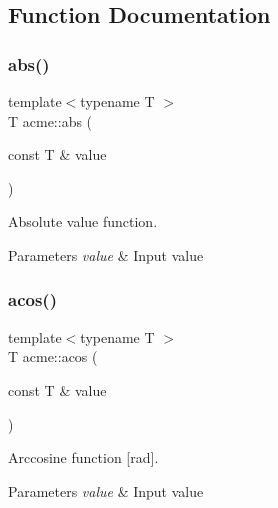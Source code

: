 \subsection{Function Documentation}
\mbox{\label{namespaceacme_add7b88267b101300f6818a0ed6dacf2a}} 
\subsubsection{\texorpdfstring{abs()}{abs()}}
{\footnotesize\ttfamily template$<$typename T $>$ \\
T acme\+::abs (\begin{DoxyParamCaption}\item[{const T \&}]{value }\end{DoxyParamCaption})\hspace{0.3cm}{\ttfamily [inline]}}



Absolute value function. 


\begin{DoxyParams}{Parameters}
{\em value} & Input value \\
\hline
\end{DoxyParams}
\mbox{\label{namespaceacme_a9ea04b104383cbb01ba4b6bc8fbd1823}} 
\subsubsection{\texorpdfstring{acos()}{acos()}}
{\footnotesize\ttfamily template$<$typename T $>$ \\
T acme\+::acos (\begin{DoxyParamCaption}\item[{const T \&}]{value }\end{DoxyParamCaption})\hspace{0.3cm}{\ttfamily [inline]}}



Arccosine function \mbox{[}rad\mbox{]}. 


\begin{DoxyParams}{Parameters}
{\em value} & Input value \\
\hline
\end{DoxyParams}
\mbox{\label{namespaceacme_a8c712ed5d1336fab688be5cd7c6afd07}} 
